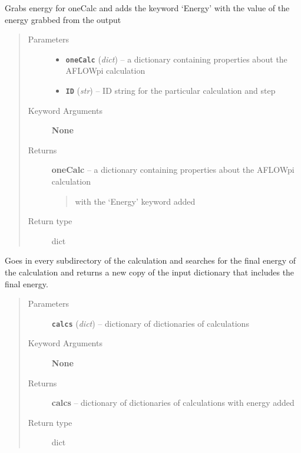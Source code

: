 \documentclass[letterpaper,10pt,english]{sphinxmanual}
\begin{document}
\begin{fulllineitems}
\label{retr:retr.grabEnergy}
Grabs energy for oneCalc and adds the keyword `Energy' with the value of the energy grabbed from the output
\begin{quote}\begin{description}
\item[{Parameters}] \leavevmode\begin{itemize}
\item {} 
\textbf{\texttt{oneCalc}} (\emph{dict}) -- a dictionary containing properties about the AFLOWpi calculation

\item {} 
\textbf{\texttt{ID}} (\emph{str}) -- ID string for the particular calculation and step

\end{itemize}

\item[{Keyword Arguments}] \leavevmode
\textbf{None}

\item[{Returns}] \leavevmode

\textbf{oneCalc} --
a dictionary containing properties about the AFLOWpi calculation
\begin{quote}

with the `Energy' keyword added
\end{quote}


\item[{Return type}] \leavevmode
dict

\end{description}\end{quote}

\end{fulllineitems}


\begin{fulllineitems}
\label{retr:retr.grabEnergyOut}
Goes in every subdirectory of the calculation and searches
for the final energy of the calculation and returns a new
copy of the input dictionary that includes the final energy.
\begin{quote}\begin{description}
\item[{Parameters}] \leavevmode
\textbf{\texttt{calcs}} (\emph{dict}) -- dictionary of dictionaries of calculations

\item[{Keyword Arguments}] \leavevmode
\textbf{None}

\item[{Returns}] \leavevmode
\textbf{calcs} --
dictionary of dictionaries of calculations with energy added

\item[{Return type}] \leavevmode
dict

\end{description}\end{quote}

\end{fulllineitems}
\end{document}
